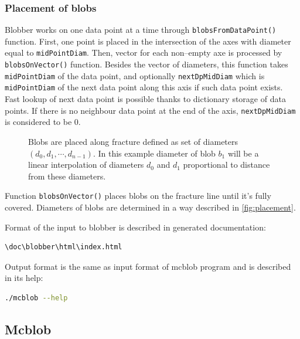 \subsubsection{Placement of blobs}

Blobber works on one data point at a time through \texttt{blobs\-From\-Data\-Point()}
function. First, one point is placed in the intersection of the axes with
diameter equal to \texttt{mid\-Point\-Diam}. Then, vector for each non--empty
axe is processed by \texttt{blobsOnVector()} function. Besides the vector of
diameters, this function takes \texttt{midPointDiam} of the data point, and optionally
\texttt{nextDpMidDiam} which is \texttt{midPointDiam} of the next data point
along this axis if such data point exists. Fast lookup of next data point
is possible thanks to dictionary storage of data points. If there is no neighbour data
point at the end of the axis, \texttt{nextDpMidDiam} is considered to be 0.

\begin{figure}[htb]
  \begin{center}
    
  \end{center}
  \caption{Blobs are placed along fracture defined as set of diameters
    $(d_0,d_1,\cdots,d_{n-1})$. In this example diameter of blob $b_1$ will be a
    linear interpolation of diameters $d_0$ and $d_1$ proportional to distance
    from these diameters.}
  \label{fig:placement}
\end{figure}

Function \texttt{blobsOnVector()} places blobs on the fracture line until
it's fully covered. Diameters of blobs are determined in a way described
in \autoref{fig:placement}.

Format of the input to blobber is described in generated documentation:
\begin{lstlisting}[language=bash,numbers=none]
\doc\blobber\html\index.html
\end{lstlisting}

Output format is the same as input format of mcblob program and is described in
its help:
\begin{lstlisting}[language=bash,numbers=none]
./mcblob --help
\end{lstlisting}

\subsection{Mcblob}
\label{sub:mcblob}

